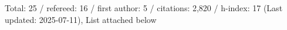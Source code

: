 Total: 25 / refereed: 16 / first author: 5 / citations: 2,820 / h-index: 17 (Last updated: 2025-07-11), List attached below